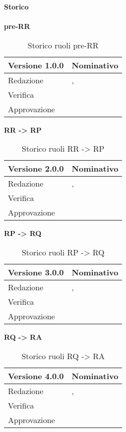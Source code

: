 \newpage
\Large{\textbf{Storico }}\\
\normalsize \\

\textbf{pre-RR}
\label{tabVers1}
\begin{table}[h]
	\begin{tabular}{p{} p{}}
		\toprule \textbf{Versione 1.0.0}	&	\textbf{Nominativo}\\
		\midrule Redazione	& \VG, \TP \\
		\midrule Verifica &	\FM\\
		\midrule Approvazione	& \PM \\
		\bottomrule
	\end{tabular}
	\caption{Storico ruoli pre-RR}
\end{table}

\textbf{RR -> RP}
\label{tabVers2}
\begin{table}[h]
	\begin{tabular}{p{} p{}}
		\toprule \textbf{Versione 2.0.0}	&	\textbf{Nominativo}\\
		\midrule Redazione	& \PM, \BM \\
		\midrule Verifica &	\TP\\
		\midrule Approvazione	& \VG \\
		\bottomrule
	\end{tabular}
	\caption{Storico ruoli RR -> RP}
\end{table}

\textbf{RP -> RQ}
\label{tabVers3}
\begin{table}[h]
	\begin{tabular}{p{} p{}}
		\toprule \textbf{Versione 3.0.0}	&	\textbf{Nominativo}\\
		\midrule Redazione	& \PM, \BM \\
		\midrule Verifica &	\TP\\
		\midrule Approvazione	& \FM \\
		\bottomrule
	\end{tabular}
	\caption{Storico ruoli RP -> RQ}
\end{table}

\textbf{RQ -> RA}
\label{tabVers4}
\begin{table}[h]
	\begin{tabular}{p{} p{}}
		\toprule \textbf{Versione 4.0.0}	&	\textbf{Nominativo}\\
		\midrule Redazione	& \PM, \BM \\
		\midrule Verifica &	\TP\\
		\midrule Approvazione	& \FM \\
		\bottomrule
	\end{tabular}
	\caption{Storico ruoli RQ -> RA}
\end{table}


